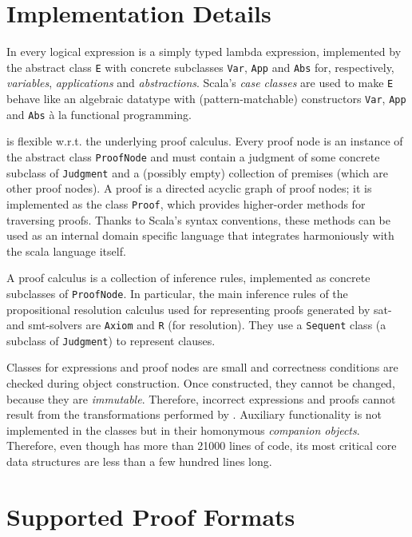\documentclass{llncs}
\begin{document}
\newcommand{\class}[1]{\texttt{#1}}


\section{Implementation Details}

In {\skeptik} every logical expression is a simply typed lambda expression, implemented by the abstract class \class{E} with concrete subclasses \class{Var}, \class{App} and \class{Abs} for, respectively, \emph{variables}, \emph{applications} and \emph{abstractions}. Scala's \emph{case classes} are used to make \class{E} behave like an algebraic datatype with (pattern-matchable) constructors \class{Var}, \class{App} and \class{Abs} \`{a} la functional programming.

{\skeptik} is flexible w.r.t. the underlying proof calculus. Every proof node is an instance of the abstract class \class{ProofNode} and must contain a judgment of some concrete subclass of \class{Judgment} and a (possibly empty) collection of premises (which are other proof nodes). A proof is a directed acyclic graph of proof nodes; it is implemented as the class \class{Proof}, which provides higher-order methods for traversing proofs. Thanks to Scala's syntax conventions, these methods can be used as an internal domain specific language that integrates harmoniously with the scala language itself.

A proof calculus is a collection of inference rules, implemented as concrete subclasses of \class{ProofNode}. In particular, the main inference rules of the propositional resolution calculus used for representing proofs generated by sat- and smt-solvers are \class{Axiom} and \class{R} (for resolution). They use a \class{Sequent} class (a subclass of \class{Judgment}) to represent clauses.

Classes for expressions and proof nodes are small and correctness conditions are checked during object construction. Once constructed, they cannot be changed, because they are \emph{immutable}. Therefore, incorrect expressions and proofs cannot result from the transformations performed by {\skeptik}. Auxiliary functionality is not implemented in the classes but in their homonymous \emph{companion objects}. Therefore, even though {\skeptik} has more than 21000 lines of code, its most critical core data structures are less than a few hundred lines long.


\section{Supported Proof Formats}
\label{sec:ProofFormats}
\end{document}
